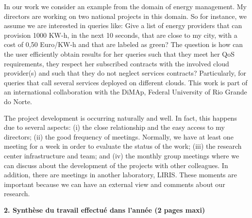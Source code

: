 \documentclass[11pt,a4paper,oneside]{report}
\begin{document}

In our work we consider an example from the domain of energy management. My directors are working on two national projects in this domain. So for instance, we assume we are interested in queries like: Give a list of energy providers that can provision 1000 KW-h, in the next 10 seconds, that are close to my city, with a cost of 0,50 Euro/KW-h and that are labeled as green? The question is how can the user efficiently obtain results for her queries such that they meet her QoS requirements, they respect her subscribed contracts with the involved cloud provider(s) and such that they do not neglect services contracts? Particularly, for queries that call several services deployed on different clouds. This work is part of an international collaboration with the DiMAp, Federal University of Rio Grande do Norte.

The project development is occurring naturally and well. In fact, this happens due to several aspects: (i) the close relationship and the easy access to my directors; (ii) the good frequency of meetings. Normally, we have at least one meeting for a week in order to evaluate the status of the work; (iii) the research center infrastructure and team; and (iv) the monthly group meetings where we can discuss about the development of the projects with other colleagues. In addition, there are meetings in another laboratory, LIRIS. These moments are important because we can have an external view and comments about our research.

\newpage
\begin{flushleft}
\textbf{2. Synthèse du travail effectué dans l’année (2 pages maxi)}\\
\end{flushleft}\label{sec:2}
\end{document}
